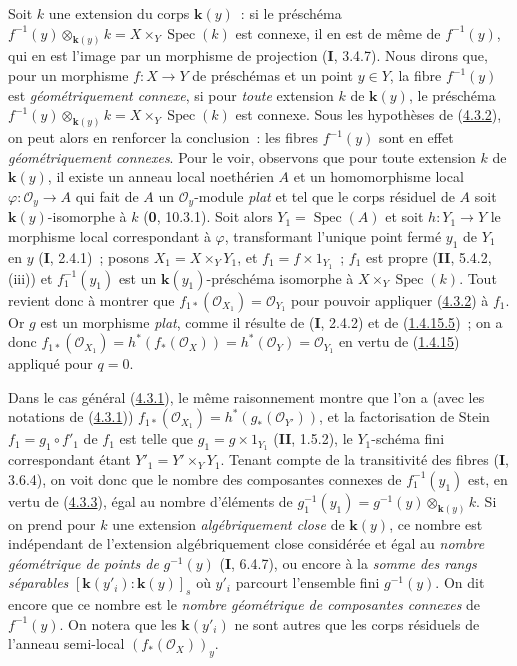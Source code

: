 \begin{remark}[4.3.4]
\label{III.4.3.4-fr}
Soit $k$ une extension du corps $\boldsymbol{k}(y)$~: si le préschéma
$f^{-1}(y)\otimes_{\boldsymbol{k}(y)}k=X\times_Y\operatorname{Spec}(k)$
est connexe, il en est de même de $f^{-1}(y)$, qui en est l'image par un
morphisme de projection (\textbf{I}, 3.4.7). Nous dirons que, pour un morphisme
$f:X\to Y$ de préschémas et un point $y\in Y$, la fibre $f^{-1}(y)$ est
\emph{géométriquement connexe}, si pour \emph{toute} extension $k$ de $\boldsymbol{k}(y)$, le
préschéma
$f^{-1}(y)\otimes_{\boldsymbol{k}(y)}k=X\times_Y\operatorname{Spec}(k)$ est connexe.
Sous les hypothèses de (\hyperref[III.4.3.2-fr]{4.3.2}), on peut alors en
renforcer la conclusion~: les fibres $f^{-1}(y)$ sont en effet
\emph{géométriquement connexes}. Pour le voir, observons que pour toute
extension $k$ de $\boldsymbol{k}(y)$, il existe un anneau local noethérien $A$ et un
homomorphisme local $\varphi:\mathcal O_y\to A$ qui fait de $A$ un
$\mathcal O_y$-module \emph{plat} et tel que le corps résiduel de $A$ soit
$\boldsymbol{k}(y)$-isomorphe à $k$ (\textbf{0}, 10.3.1). Soit alors
$Y_1=\operatorname{Spec}(A)$ et soit $h:Y_1\to Y$ le morphisme local
correspondant à $\varphi$, transformant l'unique point fermé $y_1$ de $Y_1$
en $y$ (\textbf{I}, 2.4.1)~; posons
$X_1=X\times_YY_1$, et $f_1=f\times1_{Y_1}$~; $f_1$ est propre
(\textbf{II}, 5.4.2, (iii)) et $f_1^{-1}(y_1)$ est un $\boldsymbol{k}(y_1)$-préschéma isomorphe à
$X\times_Y\operatorname{Spec}(k)$. Tout revient donc à montrer que
$f_{1*}(\mathcal O_{X_1})=\mathcal O_{Y_1}$ pour pouvoir appliquer
(\hyperref[III.4.3.2-fr]{4.3.2}) à $f_1$. Or $g$ est un morphisme \emph{plat},
comme il résulte de (\textbf{I}, 2.4.2) et de
(\hyperref[III.1.4.15-fr]{1.4.15.5})~; on a donc
$f_{1*}(\mathcal O_{X_1})
=h^*(f_*(\mathcal O_X))
=h^*(\mathcal O_Y)
=\mathcal O_{Y_1}$
en vertu de (\hyperref[III.1.4.15-fr]{1.4.15}) appliqué pour $q=0$.

Dans le cas général (\hyperref[III.4.3.1-fr]{4.3.1}), le même raisonnement
montre que l'on a (avec les notations de
(\hyperref[III.4.3.1-fr]{4.3.1}))
$f_{1*}(\mathcal O_{X_1})=h^*(g_*(\mathcal O_{Y'}))$,
et la factorisation de Stein $f_1=g_1\circ f'_1$ de $f_1$ est telle que
$g_1=g\times1_{Y_1}$ (\textbf{II}, 1.5.2), le $Y_1$-schéma fini correspondant étant
$Y'_1=Y'\times_YY_1$. Tenant compte de la transitivité des fibres
(\textbf{I}, 3.6.4), on voit donc que le nombre des composantes connexes de
$f_1^{-1}(y_1)$ est, en vertu de
(\hyperref[III.4.3.3-fr]{4.3.3}), égal au nombre d'éléments de
$g_1^{-1}(y_1)=g^{-1}(y)\otimes_{\boldsymbol{k}(y)}k$.
Si on prend pour $k$ une extension \emph{algébriquement close} de $\boldsymbol{k}(y)$, ce nombre
est indépendant de l'extension algébriquement close considérée et égal au
\emph{nombre géométrique de points de} $g^{-1}(y)$ (\textbf{I}, 6.4.7), ou encore à
la \emph{somme des rangs séparables}
$[\boldsymbol{k}(y'_i):\boldsymbol{k}(y)]_s$
où $y'_i$ parcourt l'ensemble fini $g^{-1}(y)$. On dit encore que ce nombre
est le \emph{nombre géométrique de composantes connexes} de $f^{-1}(y)$. On
notera que les $\boldsymbol{k}(y'_i)$ ne sont autres que les corps résiduels de l'anneau
semi-local $(f_*(\mathcal O_X))_y$.
\end{remark}

